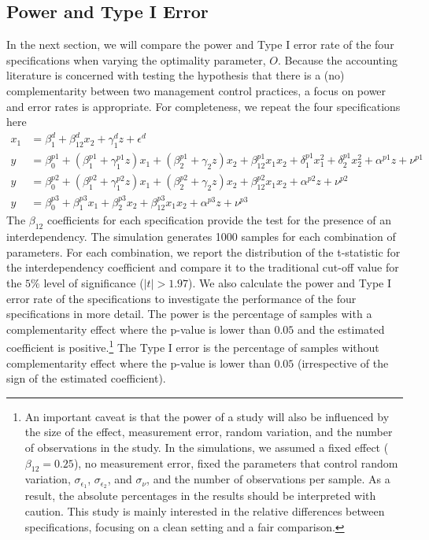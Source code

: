 \documentclass[12pt]{article}
\begin{document}
\subsection{Power and Type I Error}
In the next section, we will compare the power and Type I error rate of the four specifications when varying the optimality parameter, $O$. Because the accounting literature is concerned with testing the hypothesis that there is a (no) complementarity between two management control practices, a focus on power and error rates is appropriate. For completeness, we repeat the four specifications here
\begin{align*} 
x_1 &= \beta_1^d + \beta_{12}^d x_2 
        + \gamma_{1}^d z
        + \epsilon^d \\
y &=  \beta^{p1}_0 + (\beta^{p1}_{1} + \gamma_1^{p1} z )x_1 
						+ (\beta_{2}^{p1} + \gamma_2 z ) x_2 
                        + \beta_{12}^{p1} x_1 x_2 
                        + \delta_1^{p1} x^2_1 + \delta_2^{p1} x^2_2 
                        + \alpha^{p1} z
                        + \nu^{p1} \\
 y &=  \beta^{p2}_0 + (\beta^{p2}_{1} + \gamma_1^{p2} z )x_1 
						+ (\beta_{2}^{p2} + \gamma_2 z ) x_2 
                        + \beta_{12}^{p2} x_1 x_2 
                        + \alpha^{p2} z
                        + \nu^{p2} \\
 y &=  \beta^{p3}_0 + \beta^{p3}_{1} x_1 
						+ \beta_{2}^{p3} x_2 
                        + \beta_{12}^{p3} x_1 x_2 
                        + \alpha^{p3} z
                        + \nu^{p3}
\end{align*}
The $\beta_{12}$ coefficients for each specification provide the test for the presence of an interdependency. The simulation generates 1000 samples for each combination of parameters. For each combination, we report the distribution of the t-statistic for the interdependency coefficient and compare it to the traditional cut-off value for the $5\%$ level of significance ($|t| > 1.97$). We also calculate the power and Type I error rate of the specifications to investigate the performance of the four specifications in more detail. The power is the percentage of samples with a complementarity effect where the p-value is lower than $0.05$ and the estimated coefficient is positive.\footnote{An important caveat is that the power of a study will also be influenced by the size of the effect, measurement error, random variation, and the number of observations in the study. In the simulations, we assumed a fixed effect ($\beta_{12} = 0.25$), no measurement error, fixed the parameters that control random variation, $\sigma_{\epsilon_1}$, $\sigma_{\epsilon_2}$, and $\sigma_{\nu}$, and the number of observations per sample. As a result, the absolute percentages in the results should be interpreted with caution. This study is mainly interested in the relative differences between specifications, focusing on a clean setting and a fair comparison.} The Type I error is the percentage of samples without complementarity effect where the p-value is lower than $0.05$ (irrespective of the sign of the estimated coefficient). 
\end{document}
